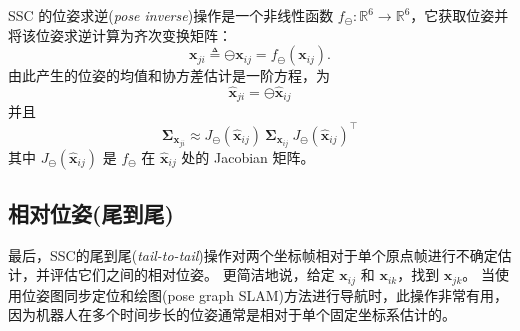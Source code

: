 SSC 的位姿求逆(\textit{pose inverse})操作是一个非线性函数 $f_\ominus: \mathbb{R}^6 \rightarrow \mathbb{R}^6 $，它获取位姿并将该位姿求逆计算为齐次变换矩阵： 
\begin{equation}
    \mathbf{x}_{ji} \triangleq \ominus \mathbf{x}_{ij} = f_\ominus(\mathbf{x}_{ij}).
\end{equation}
由此产生的位姿的均值和协方差估计是一阶方程，为
\begin{equation}
    \hat{\mathbf{x}}_{ji} = \ominus \hat{\mathbf{x}}_{ij} 
\end{equation}
并且 
\begin{equation}
    \boldsymbol{\Sigma}_{\mathbf{x}_{ji}} \approx J_\ominus(\hat{\mathbf{x}}_{ij}) ~ \boldsymbol{\Sigma}_{\mathbf{x}_{ij}} ~
    J_\ominus(\hat{\mathbf{x}}_{ij})^\top
\end{equation}
其中 $J_\ominus(\hat{\mathbf{x}}_{ij})$ 是 $f_\ominus$ 在 $\hat{\mathbf{x}}_{ij}$ 处的 Jacobian 矩阵。

\subsection{相对位姿(尾到尾)}
\label{sec:SSC:tail-to-tail}

最后，SSC的尾到尾(\textit{tail-to-tail})操作对两个坐标帧相对于单个原点帧进行不确定估计，并评估它们之间的相对位姿。 
更简洁地说，给定 $\mathbf{x}_{ij}$ 和 $\mathbf{x}_{ik}$，找到 $\mathbf{x}_{jk}$。 
当使用位姿图同步定位和绘图(pose graph \ac{SLAM})方法进行导航时，此操作非常有用，因为机器人在多个时间步长的位姿通常是相对于单个固定坐标系估计的。 

